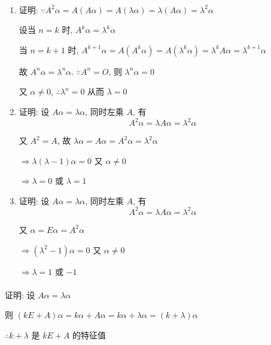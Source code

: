 	 \paragraph{} %
		 \begin{enumerate}
			 \item %
			       证明: \( \because A^{2}\alpha = A(A\alpha) = A(\lambda\alpha) = \lambda(A\alpha) = \lambda^{2}\alpha \)

			       设当 \( n = k \) 时, \( A^{k}\alpha = \lambda^{k}\alpha \)

			       当 \( n = k+1 \) 时, \( A^{k+1}\alpha = A(A^{k}\alpha) = A(\lambda^{k}\alpha) = \lambda^{k}A\alpha = \lambda^{k+1}\alpha \)

			       故 \( A^{n}\alpha = \lambda^{n}\alpha \). \( \because A^{n} = O \), 则 \( \lambda^{n}\alpha = 0 \)

			       又 \( \alpha \neq 0 \), \( \therefore \lambda^{n} = 0 \) 从而 \( \lambda = 0 \)
			 \item %
			       证明: 设 \( A\alpha = \lambda\alpha \), 同时左乘 \( A \), 有
			       \[ A^{2}\alpha = \lambda A\alpha = \lambda^{2}\alpha \]

			       又 \( A^{2} = A \), 故 \( \lambda\alpha = A\alpha = A^{2}\alpha = \lambda^{2}\alpha \)

			       \( \Rightarrow \lambda(\lambda - 1)\alpha = 0 \) 又 \( \alpha \neq 0 \)

			       \( \Rightarrow \lambda = 0 \) 或 \( \lambda = 1 \)
			 \item %
			       证明: 设 \( A\alpha = \lambda\alpha \), 同时左乘 \( A \), 有
			       \[ A^{2}\alpha = \lambda A\alpha = \lambda^{2}\alpha \]

			       又 \( \alpha = E\alpha = A^{2}\alpha \)

			       \( \Rightarrow (\lambda^{2} - 1)\alpha = 0 \) 又 \( \alpha \neq 0 \)

			       \( \Rightarrow \lambda = 1 \) 或 \( -1 \)
		 \end{enumerate}


	 \paragraph{} %
		 证明: 设 \( A\alpha = \lambda\alpha \)

		 则 \( (kE + A)\alpha = k\alpha + A\alpha = k\alpha + \lambda\alpha = (k + \lambda)\alpha \)

		 \( \therefore k + \lambda \) 是 \( kE + A \) 的特征值


